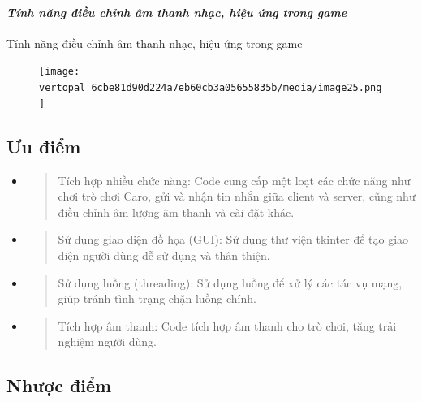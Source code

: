 \documentclass[a4paper]{article}
\begin{document}
\hypertarget{kux1ebft-nux1ed1i-tux1edbi-server-host}{%
\paragraph{\texorpdfstring{\emph{Tính năng điều chỉnh âm thanh nhạc, hiệu ứng trong game}}{Thông báo kết quả thắng thua}}\label{kux1ebft-nux1ed1i-tux1edbi-server-host}}
 Tính năng điều chỉnh âm thanh nhạc, hiệu ứng trong game

\begin{figure}
    \centering

\texttt{[image: vertopal\_6cbe81d90d224a7eb60cb3a05655835b/media/image25.png]}

\end{figure}


\hypertarget{ux1b0u-ux111iux1ec3m}{%
\subsection{Ưu điểm}\label{ux1b0u-ux111iux1ec3m}}

\begin{itemize}
\item
  \begin{quote}
  Tích hợp nhiều chức năng: Code cung cấp một loạt các chức năng như
  chơi trò chơi Caro, gửi và nhận tin nhắn giữa client và server, cũng
  như điều chỉnh âm lượng âm thanh và cài đặt khác.
  \end{quote}
\item
  \begin{quote}
  Sử dụng giao diện đồ họa (GUI): Sử dụng thư viện tkinter để tạo giao
  diện người dùng dễ sử dụng và thân thiện.
  \end{quote}
\item
  \begin{quote}
  Sử dụng luồng (threading): Sử dụng luồng để xử lý các tác vụ mạng,
  giúp tránh tình trạng chặn luồng chính.
  \end{quote}
\item
  \begin{quote}
  Tích hợp âm thanh: Code tích hợp âm thanh cho trò chơi, tăng trải
  nghiệm người dùng.
  \end{quote}
\end{itemize}

\hypertarget{nhux1b0ux1ee3c-ux111iux1ec3m}{%
\subsection{Nhược điểm}\label{nhux1b0ux1ee3c-ux111iux1ec3m}}
\end{document}
